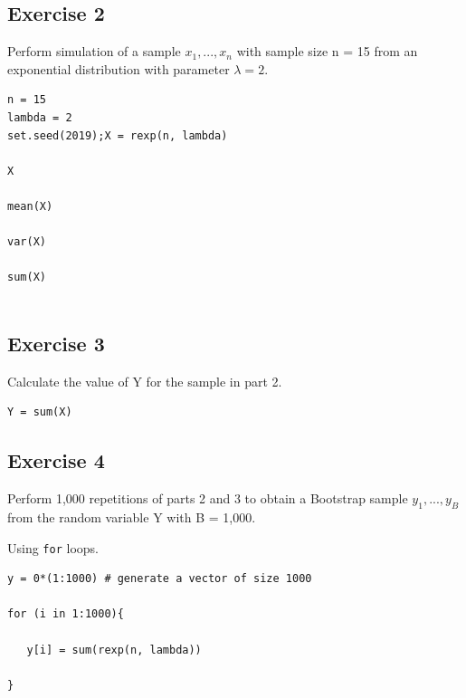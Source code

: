 \documentclass[a4paper,12pt]{article}
\begin{document}
\subsection*{Exercise 2}

Perform simulation of a sample $x_1 , ..., x_n$ with sample size n = 15 from an
exponential distribution with parameter $\lambda = 2$.


\begin{framed}\begin{verbatim}
n = 15
lambda = 2
set.seed(2019);X = rexp(n, lambda)

X 

mean(X)

var(X)

sum(X) 


\end{verbatim}\end{framed}





\newpage 

\subsection*{Exercise 3}

Calculate the value of Y for the sample in part 2.

\begin{framed}\begin{verbatim}
Y = sum(X)
\end{verbatim}\end{framed}



\newpage 
\subsection*{Exercise 4}
\noindent Perform 1,000 repetitions of parts 2 and 3 to obtain a Bootstrap sample
$y_1 , ..., y_B$ from the random variable Y with B = 1,000.


\noindent Using \texttt{for} loops.
\begin{framed}\begin{verbatim}
y = 0*(1:1000) # generate a vector of size 1000

for (i in 1:1000){

   y[i] = sum(rexp(n, lambda))

} 
\end{verbatim}\end{framed}
\end{document}

